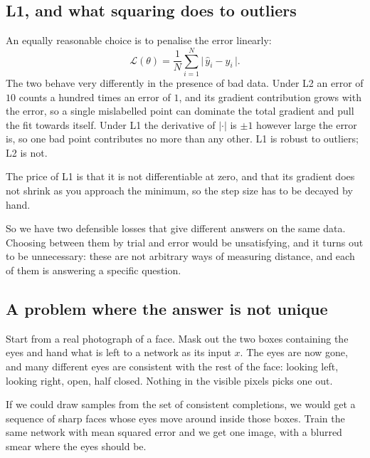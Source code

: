 \documentclass[11pt]{article}
\newcommand{\Loss}{\mathcal{L}}
\newcommand{\yhat}{\hat{y}}
\begin{document}
\subsection*{L1, and what squaring does to outliers}

An equally reasonable choice is to penalise the error linearly:
%
\[
  \Loss(\theta) = \frac{1}{N}\sum_{i=1}^{N}\big|\,\yhat_i - y_i\,\big| .
\]
%
The two behave very differently in the presence of bad data. Under L2 an error of $10$
counts a hundred times an error of $1$, and its gradient contribution grows with the error,
so a single mislabelled point can dominate the total gradient and pull the fit towards
itself. Under L1 the derivative of $|\cdot|$ is $\pm 1$ however large the error is, so one
bad point contributes no more than any other. L1 is robust to outliers; L2 is not.

\medskip
\noindent
The price of L1 is that it is not differentiable at zero, and that its gradient does not
shrink as you approach the minimum, so the step size has to be decayed by hand.

\medskip
\noindent
So we have two defensible losses that give different answers on the same data. Choosing
between them by trial and error would be unsatisfying, and it turns out to be unnecessary:
these are not arbitrary ways of measuring distance, and each of them is answering a
specific question.

\subsection*{A problem where the answer is not unique}

Start from a real photograph of a face. Mask out the two boxes containing the eyes and
hand what is left to a network as its input $x$. The eyes are now gone, and many different
eyes are consistent with the rest of the face: looking left, looking right, open, half
closed. Nothing in the visible pixels picks one out.

\medskip
\noindent
If we could draw samples from the set of consistent completions, we would get a sequence of
sharp faces whose eyes move around inside those boxes. Train the same network with mean
squared error and we get one image, with a blurred smear where the eyes should be.
\end{document}
